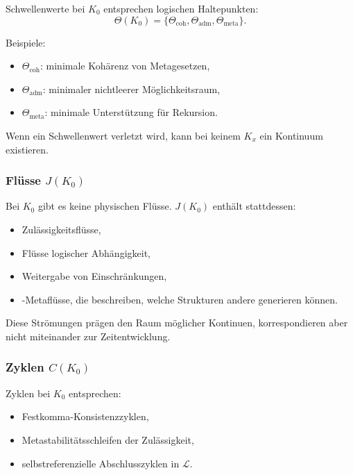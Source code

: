 Schwellenwerte bei $K_0$ entsprechen logischen Haltepunkten:
\[
\Theta(K_0) = \{ \Theta_{\mathrm{coh}}, \Theta_{\mathrm{adm}},
                 \Theta_{\mathrm{meta}} \}.
\]

Beispiele:
\begin{itemize}
    \item $\Theta_{\mathrm{coh}}$: minimale Kohärenz von Metagesetzen,
    \item $\Theta_{\mathrm{adm}}$: minimaler nichtleerer Möglichkeitsraum,
    \item $\Theta_{\mathrm{meta}}$: minimale Unterstützung für Rekursion.
\end{itemize}

Wenn ein Schwellenwert verletzt wird, kann bei keinem $K_x$ ein Kontinuum existieren.

\subsubsection{Flüsse \texorpdfstring{$J(K_0)$}{J(K_0)}}

Bei $K_0$ gibt es keine physischen Flüsse.
$J(K_0)$ enthält stattdessen:
\begin{itemize}
    \item Zulässigkeitsflüsse,
    \item Flüsse logischer Abhängigkeit,
    \item Weitergabe von Einschränkungen,
    \item-Metaflüsse, die beschreiben, welche Strukturen andere generieren können.
\end{itemize}

Diese Strömungen prägen den Raum möglicher Kontinuen, korrespondieren aber nicht miteinander
zur Zeitentwicklung.

\subsubsection{Zyklen \texorpdfstring{$C(K_0)$}{C(K_0)}}

Zyklen bei $K_0$ entsprechen:
\begin{itemize}
    \item Festkomma-Konsistenzzyklen,
    \item Metastabilitätsschleifen der Zulässigkeit,
    \item selbstreferenzielle Abschlusszyklen in $\mathcal{L}$.
\end{itemize}


